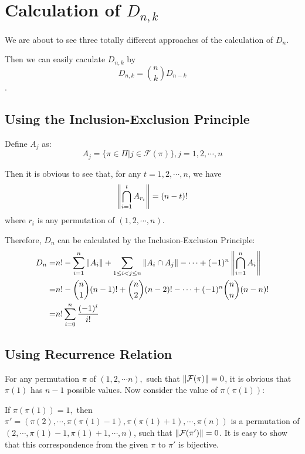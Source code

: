 
\section{Calculation of $ D_{n,k}$}
\label{sec:f-calc}
We are about to see three totally different approaches of the calculation of $ D_{n}$.

Then we can easily caculate $ D_{n,k}$ by
\[ D_{n,k} = {n\choose{k}}D_{n-k}\].

\subsection{Using the Inclusion-Exclusion Principle}

      Define $ A_j$ as:
      \[ A_j =  \{ \pi \in \Pi | j \in \mathcal{F}(\pi)\}, j = 1,2,\cdots ,n\]

      Then it is obvious to see that, for any $ t = 1,2,\cdots ,n$, we have
      \[ \card{\bigcap_{i=1}^{t}A_{r_i}} = (n-t)!\]
      where $ r_i$ is any permutation of $ (1,2,\cdots ,n).$

      Therefore, $ D_n$ can be calculated by the Inclusion-Exclusion Principle:
       \begin{align*}
       D_n = & n! - \sum_{i=1}^n\card{A_i} + \sum_{1\le i< j\le n}{\card{A_i\cap A_j}}-\cdots +
      (-1)^n\card{\bigcap_{i=1}^n{A_i}}\\
      =& n! - {n\choose{1}}(n-1)! + {n\choose{2}}(n-2)!-\cdots +(-1)^n{n\choose{n}}(n-n)!\\
      =& n!\sum_{i=0}^n{\dfrac{(-1)^i}{i!}}
      \end{align*}

      \subsection{Using Recurrence Relation}

     For any permutation $\pi$ of $ (1,2,\cdots n),$ such that $ \left\|\mathcal{F}(\pi)\right\| = 0$,
     it is obvious that $ \pi(1)$ has $ n-1$ possible values.
     Now consider the value of $ \pi(\pi(1)):$

     If $ \pi(\pi(1)) = 1, $ then $\pi'= (\pi(2),\cdots ,\pi(\pi(1)-1), \pi(\pi(1)+1), \cdots ,\pi(n))$
     is a permutation of
     $ (2,\cdots ,\pi(1)-1, \pi(1)+1, \cdots ,n)$, such that $\left\|\mathcal{F}(\pi')\right\| = 0$.
     It is easy to show that this correspondence from the given $ \pi$ to $ \pi'$ is bijective.

